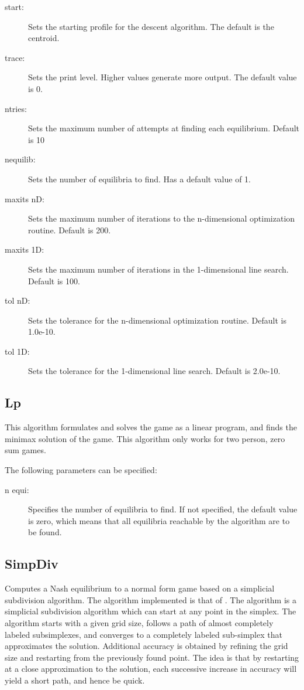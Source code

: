 \begin{description}
\item[start:] Sets the starting profile for the descent algorithm.  The
default is the centroid.
\item[trace:] Sets the print level.  Higher values generate more output.
The default value is 0.
\item[ntries:] Sets the maximum number of attempts at finding each
equilibrium. Default is 10
\item[nequilib:] Sets the number of equilibria to find.  Has a default
value of 1.  
\item[maxits nD:] Sets the maximum number of iterations to the
n-dimensional optimization routine.  Default is 200.
\item[maxits 1D:] Sets the maximum number of iterations in the
1-dimensional line search.  Default is 100.
\item[tol nD:] Sets the tolerance for the n-dimensional optimization
routine.  Default is 1.0e-10.
\item[tol 1D:] Sets the tolerance for the 1-dimensional line search.
Default is 2.0e-10.
\end{description}

\subsection{Lp}\label{Lp}
This algorithm formulates and solves the game as a linear program, and finds the 
minimax solution of the game.  This algorithm only works for two person, zero sum 
games.    

The following parameters can be specified:

\begin{description}
\item[n equi:] Specifies the number of equilibria to find.  If not specified,
the default value is zero, which means that all equilibria reachable by
the algorithm are to be found.
\end{description}

\subsection{SimpDiv}\label{SimpDiv}
Computes a Nash equilibrium to a normal form game based
on a simplicial subdivision algorithm.  The algorithm implemented is
that of \cite{VTH:1987}.  The algorithm is a simplicial subdivision
algorithm which can start at any point in the simplex.  The algorithm
starts with a given grid size, follows a path of almost completely labeled
subsimplexes, and converges to a completely labeled sub-simplex that
approximates the solution.  Additional accuracy is obtained by refining
the grid size and restarting from the previously found point.  The idea is
that by restarting at a close approximation to the solution, each
successive increase in accuracy will yield a short path, and hence be
quick.

